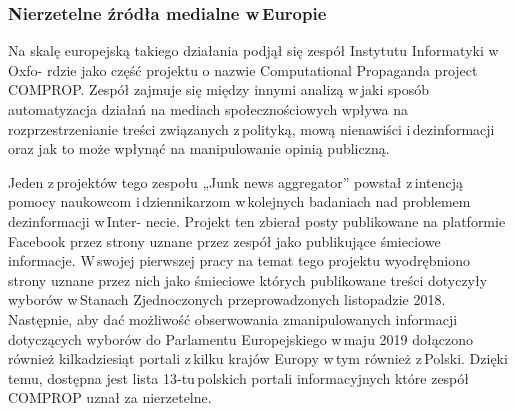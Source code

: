 \subsubsection{Nierzetelne źródła medialne w\,Europie}
Na skalę europejską takiego działania podjął się zespół Instytutu Informatyki w\,Oxfo- rdzie jako część projektu o nazwie Computational Propaganda project COMPROP. Zespół zajmuje się między innymi analizą w\,jaki sposób automatyzacja działań na mediach społecznościowych wpływa na rozprzestrzenianie treści związanych z\,polityką, mową nienawiści i\,dezinformacji oraz jak to może wpłynąć na manipulowanie opinią publiczną. 
\par
Jeden z\,projektów tego zespołu „Junk news aggregator” powstał z\,intencją pomocy naukowcom i\,dziennikarzom w\,kolejnych badaniach nad problemem dezinformacji w\,Inter- necie. Projekt ten zbierał posty publikowane na platformie Facebook przez strony uznane przez zespół jako publikujące śmieciowe informacje.  W\,swojej pierwszej pracy na temat tego projektu\cite{liotsiou2019junk} wyodrębniono strony uznane przez nich jako śmieciowe których publikowane treści dotyczyły wyborów w\,Stanach Zjednoczonych przeprowadzonych listopadzie 2018. Następnie, aby dać możliwość obserwowania zmanipulowanych informacji dotyczących wyborów do Parlamentu Europejskiego w\,maju 2019 dołączono również kilkadziesiąt portali z\,kilku krajów Europy w\,tym również z\,Polski. Dzięki temu, dostępna jest lista 13-tu\,polskich portali informacyjnych które zespół COMPROP uznał za nierzetelne. 

